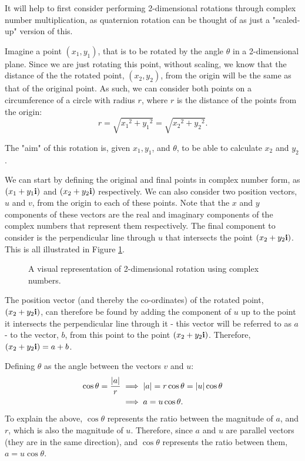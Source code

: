 \documentclass[10pt]{article}
\begin{document}
It will help to first consider performing 2-dimensional rotations \cite{ComplexRotation} through complex number multiplication, as quaternion rotation can be thought of as just a "scaled-up" version of this.

Imagine a point $(x_1, y_1)$, that is to be rotated by the angle $\theta$ in a 2-dimensional plane. Since we are just rotating this point, without scaling, we know that the distance of the the rotated point, $(x_2, y_2)$, from the origin will be the same as that of the original point. As such, we can consider both points on a circumference of a circle with radius $r$, where $r$ is the distance of the points from the origin:
\begin{equation}
    r = \sqrt{{x_1}^2 + {y_1}^2} = \sqrt{{x_2}^2 + {y_2}^2}.
\end{equation}

The "aim" of this rotation is, given $x_1, y_1$, and $\theta$, to be able to calculate $x_2$ and $y_2$.

We can start by defining the original and final points in complex number form, as $(x_1 + y_1\vb{i})$ and $(x_2 + y_2\vb{i})$ respectively. We can also consider two position vectors, $u$ and $v$, from the origin to each of these points. Note that the $x$ and $y$ components of these vectors are the real and imaginary components of the complex numbers that represent them respectively. The final component to consider is the perpendicular line through $u$ that intersects the point $(x_2 + y_2\vb{i})$. This is all illustrated in Figure \ref{ComplexRotationFig}.

\begin{figure}[ht]
    \centering
    \caption{A visual representation of 2-dimensional rotation using complex numbers.}
    \label{ComplexRotationFig}
\end{figure}

The position vector (and thereby the co-ordinates) of the rotated point, $(x_2 + y_2\vb{i})$, can therefore be found by adding the component of $u$ up to the point it intersects the perpendicular line through it - this vector will be referred to as $a$ - to the vector, $b$, from this point to the point $(x_2 + y_2\vb{i})$. Therefore, $(x_2 + y_2\vb{i}) = a + b$.

Defining $\theta$ as the angle between the vectors $v$ and $u$:
\begin{equation}
    \begin{aligned}
        \cos\theta = \frac{\abs{a}}{r} &\implies \abs{a} = r\cos\theta = \abs{u}\cos\theta \\
        &\implies a = u\cos\theta.
    \end{aligned}
\end{equation}
To explain the above, $\cos\theta$ represents the ratio between the magnitude of $a$, and $r$, which is also the magnitude of $u$. Therefore, since $a$ and $u$ are parallel vectors (they are in the same direction), and $\cos\theta$ represents the ratio between them, $a = u\cos\theta$.
\end{document}
